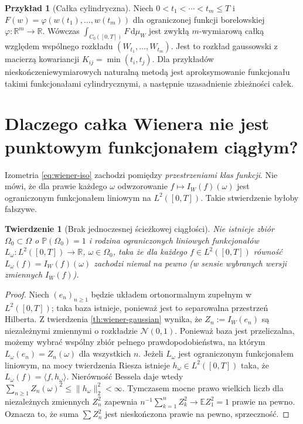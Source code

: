 \documentclass[11pt,a4paper,oneside]{report}
\numberwithin{equation}{chapter}
\theoremstyle{plain}
\newtheorem{twierdzenie}{Twierdzenie}[chapter]
\theoremstyle{definition}
\newtheorem{przyklad}{Przykład}[chapter]
\theoremstyle{remark}
\newcommand{\R}{\mathbb{R}}
\newcommand{\Prob}{\mathbb{P}}
\newcommand{\E}{\mathbb{E}}
\newcommand{\dd}{\mathrm{d}}
\newcommand{\norm}[1]{\lVert #1\rVert}
\newcommand{\Normal}{\mathcal{N}}
\begin{document}
\begin{przyklad}[Całka cylindryczna]
Niech $0<t_1<\cdots<t_m\le T$ i
$F(w)=\varphi(w(t_1),\ldots,w(t_m))$ dla ograniczonej
funkcji borelowskiej $\varphi:\R^m\to\R$.
Wówczas $\int_{C_0([0,T])} F\,\dd\mu_W$ jest zwykłą
$m$-wymiarową całką względem wspólnego rozkładu
$(W_{t_1},\ldots,W_{t_m})$. Jest to rozkład gaussowski
z macierzą kowariancji $K_{ij}=\min(t_i,t_j)$.
Dla przykładów nieskończeniewymiarowych naturalną metodą
jest aproksymowanie funkcjonału takimi funkcjonałami
cylindrycznymi, a następnie uzasadnienie zbieżności całek.
\end{przyklad}

\section{Dlaczego całka Wienera nie jest punktowym funkcjonałem ciągłym?}\label{sec:volIII:01:07}
Izometria \eqref{eq:wiener-iso} zachodzi pomiędzy
\emph{przestrzeniami klas funkcji}. Nie mówi, że dla prawie
każdego $\omega$ odwzorowanie
$f\mapsto I_W(f)(\omega)$ jest ograniczonym funkcjonałem
liniowym na $L^2([0,T])$. Takie stwierdzenie byłoby fałszywe.

\begin{twierdzenie}[Brak jednoczesnej ścieżkowej ciągłości]\label{thm:volIII:01:06}
Nie istnieje zbiór $\Omega_0\subset\Omega$ o
$\Prob(\Omega_0)=1$ i rodzina ograniczonych liniowych
funkcjonałów $L_\omega:L^2([0,T])\to\R$, $\omega\in\Omega_0$,
taka że dla każdego $f\in L^2([0,T])$ równość
$L_\omega(f)=I_W(f)(\omega)$ zachodzi niemal na pewno
(w sensie wybranych wersji zmiennych $I_W(f)$).
\end{twierdzenie}
\begin{proof}
Niech $(e_n)_{n\ge1}$ będzie układem ortonormalnym zupełnym
w $L^2([0,T])$; taka baza istnieje, ponieważ jest to
separowalna przestrzeń Hilberta. Z twierdzenia
\ref{th:wiener-gaussian} wynika, że
$Z_n:=I_W(e_n)$ są niezależnymi zmiennymi o rozkładzie
$\Normal(0,1)$. Ponieważ baza jest przeliczalna, możemy
wybrać wspólny zbiór pełnego prawdopodobieństwa, na którym
$L_\omega(e_n)=Z_n(\omega)$ dla wszystkich $n$.
Jeżeli $L_\omega$ jest ograniczonym funkcjonałem liniowym,
na mocy twierdzenia Riesza istnieje $h_\omega\in L^2([0,T])$
taka, że $L_\omega(f)=\langle f,h_\omega\rangle$.
Nierówność Bessela daje wtedy
$\sum_{n\ge1}Z_n(\omega)^2\le\norm{h_\omega}_2^2<\infty$.
Tymczasem mocne prawo wielkich liczb dla niezależnych
zmiennych $Z_n^2$ zapewnia
$n^{-1}\sum_{k=1}^nZ_k^2\to\E Z_1^2=1$ prawie na pewno.
Oznacza to, że suma $\sum Z_n^2$ jest nieskończona
prawie na pewno, sprzeczność.
\end{proof}
\end{document}

